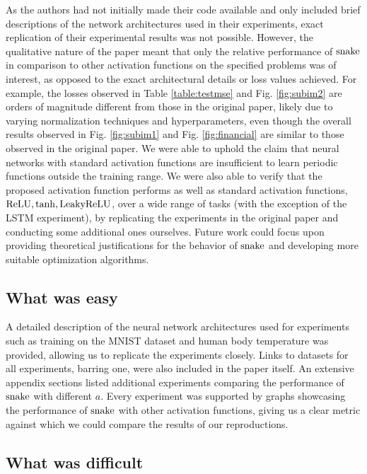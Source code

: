 As the authors had not initially made their code available and only included brief descriptions of the network architectures used in their experiments, exact replication of their experimental results was not possible. However, the qualitative nature of the paper meant that only the relative performance of $ \operatorname{snake} $ in comparison to other activation functions on the specified problems was of interest, as opposed to the exact architectural details or loss values achieved. For example, the losses observed in Table \ref{table:testmse} and Fig. \ref{fig:subim2} are orders of magnitude different from those in the original paper, likely due to varying normalization techniques and hyperparameters, even though the overall results observed in Fig. \ref{fig:subim1} and Fig. \ref{fig:financial} are similar to those observed in the original paper. We were able to uphold the claim that neural networks with standard activation functions are insufficient to learn periodic functions outside the training range. We were also able to verify that the proposed activation function performs as well as standard activation functions, $ \operatorname{ReLU}, \tanh, \operatorname{LeakyReLU} $, over a wide range of tasks (with the exception of the LSTM experiment), by replicating the experiments in the original paper and conducting some additional ones ourselves. Future work could focus upon providing theoretical justifications for the behavior of $ \operatorname{snake} $ and developing more suitable optimization algorithms.


\subsection{What was easy}

A detailed description of the neural network architectures used for experiments such as training on the MNIST dataset and human body temperature was provided, allowing us to replicate the experiments closely. Links to datasets for all experiments, barring one, were also included in the paper itself. An extensive appendix sections listed additional experiments comparing the performance of $ \operatorname{snake} $ with different $a$. Every experiment was supported by graphs showcasing the performance of $ \operatorname{snake} $ with other activation functions, giving us a clear metric against which we could compare the results of our reproductions.

\subsection{What was difficult}

